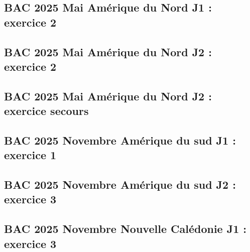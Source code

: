 \documentclass[lang=fr,edition=teacher,layout=sheet]{mxbook}
\begin{document}
\begingroup\endgroup
\par\bigskip
{}\subsection*{BAC 2025 Mai Amérique du Nord J1 : exercice 2}
\begingroup\endgroup
\par\bigskip
{}\subsection*{BAC 2025 Mai Amérique du Nord J2 : exercice 2}
\begingroup\endgroup
\par\bigskip
{}\subsection*{BAC 2025 Mai Amérique du Nord J2 : exercice secours}
\begingroup\endgroup
\par\bigskip
{}\subsection*{BAC 2025 Novembre Amérique du sud J1 : exercice 1}
\begingroup\endgroup
\par\bigskip
{}\subsection*{BAC 2025 Novembre Amérique du sud J2 : exercice 3}
\begingroup\endgroup
\par\bigskip
{}\subsection*{BAC 2025 Novembre Nouvelle Calédonie J1 : exercice 3}
\begingroup\endgroup
\par\bigskip
\end{document}
